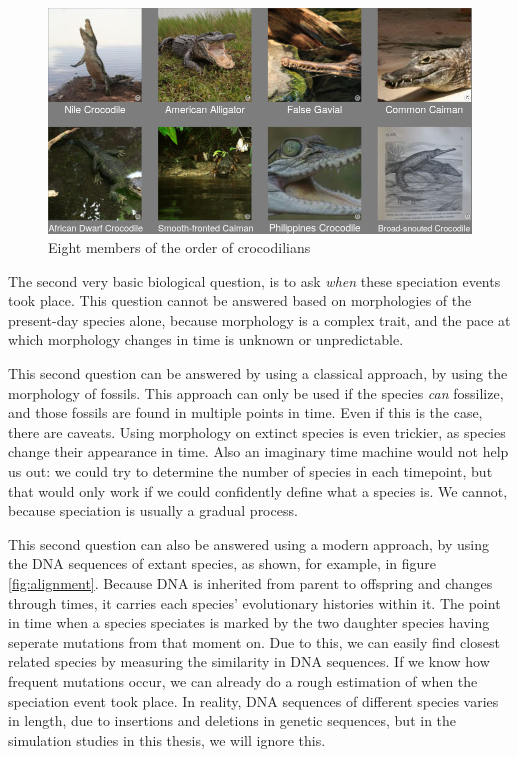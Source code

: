 \begin{figure}[H]
  \includegraphics[width=1.0\textwidth]{crocodilians.png}
  \caption{
    Eight members of the order of crocodilians
  }
  \label{fig:crocodialians}
\end{figure}

The second very basic biological question, is to 
ask \emph{when} these speciation events took place.
This question cannot be answered based on morphologies of the present-day
species alone, because morphology is a complex trait, and the pace at
which morphology changes in time is unknown or unpredictable.

This second question can be answered by
using a classical approach, 
by using the morphology of fossils.
This approach can only be used if the species \emph{can} fossilize,
and those fossils are found in multiple points in time.
Even if this is the case, there are caveats. Using morphology on
extinct species is even trickier, as species change their appearance in time.
Also an imaginary time machine would not help us out:
we could try to determine the number of species in each timepoint,
but that would only work if we could confidently define what a
species is. We cannot, because speciation is usually a gradual process.

This second question can also be answered 
using a modern approach, 
by using the DNA sequences of extant species,
as shown, for example, in figure \ref{fig:alignment}.
Because DNA is inherited from parent to offspring
and changes through times, it carries each species' 
evolutionary histories within it.
The point in time when a species speciates is
marked by the two daughter species having seperate mutations
from that moment on.
Due to this, we can easily find closest related species 
by measuring the similarity in DNA sequences.
If we know how frequent mutations occur, we can already
do a rough estimation of when the speciation event took place.
In reality, DNA sequences of different species 
varies in length, due to insertions and deletions in genetic sequences,
but in the simulation studies in this thesis, we will ignore this.

